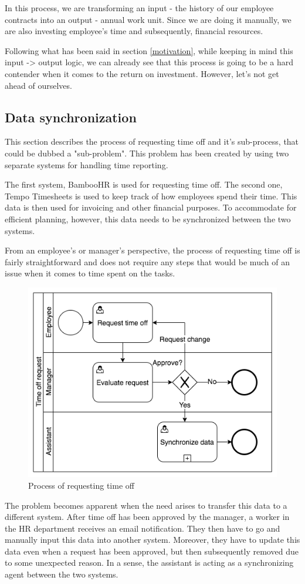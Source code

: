 \documentclass[12pt,oneside]{fithesis2}
\begin{document}
In this process, we are transforming an input - the history of our employee contracts into an output - annual work unit. Since we are doing it manually, we are also investing employee's time and subsequently, financial resources. 

Following what has been said in section \ref{motivation}, while keeping in mind this input -> output logic, we can already see that this process is going to be a hard contender when it comes to the return on investment. However, let's not get ahead of ourselves.

\subsection{Data synchronization}
This section describes the process of requesting time off and it's sub-process, that could be dubbed a "sub-problem". This problem has been created by using two separate systems for handling time reporting.

The first system, BambooHR is used for requesting time off. The second one, Tempo Timesheets is used to keep track of how employees spend their time. This data is then used for invoicing and other financial purposes. To accommodate for efficient planning, however, this data needs to be synchronized between the two systems.

From an employee's or manager's perspective, the process of requesting time off is fairly straightforward and does not require any steps that would be much of an issue when it comes to time spent on the tasks.
\begin{figure}[H]
    \centering
    \includegraphics[width=\textwidth]{before_sys_integration.png}
    \caption{Process of requesting time off}
    \label{fig:before_sys_integration}
\end{figure}
\newpage
The problem becomes apparent when the need arises to transfer this data to a different system. After time off has been approved by the manager, a worker in the HR department receives an email notification. They then have to go and manually input this data into another system. Moreover, they have to update this data even when a request has been approved, but then subsequently removed due to some unexpected reason. In a sense, the assistant is acting as a synchronizing agent between the two systems.
\end{document}
